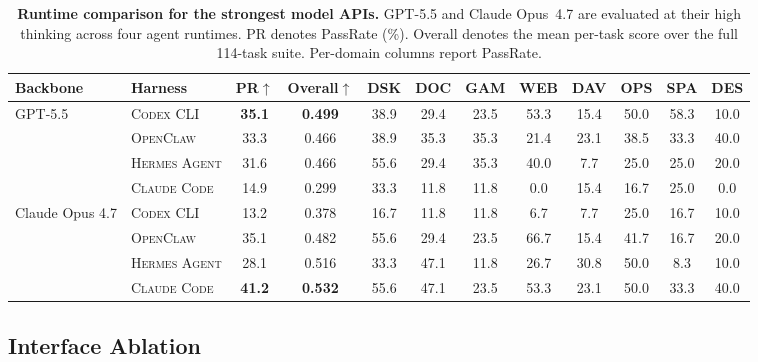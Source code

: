 \begin{table}[t]
\centering
\footnotesize
\setlength{\tabcolsep}{3pt}
\renewcommand{\arraystretch}{1.15}
\caption{\textbf{Runtime comparison for the strongest model APIs.}
GPT-5.5 and Claude Opus~4.7 are evaluated at their high thinking across four agent runtimes. PR denotes PassRate (\%). Overall denotes the mean per-task score over the full 114-task suite. Per-domain columns report PassRate.}
\label{tab:cross-harness}
\begin{tabular}{l l cc | cccccccc}
\toprule
\textbf{Backbone} & \textbf{Harness} & \textbf{PR}$\uparrow$ & \textbf{Overall}$\uparrow$ & \textbf{DSK} & \textbf{DOC} & \textbf{GAM} & \textbf{WEB} & \textbf{DAV} & \textbf{OPS} & \textbf{SPA} & \textbf{DES} \\
\midrule
\multirow{4}{*}{GPT-5.5}
& \textsc{Codex CLI}    & \textbf{35.1} & \textbf{0.499} & 38.9 & 29.4 & 23.5 & 53.3 & 15.4 & 50.0 & 58.3 & 10.0 \\
& \textsc{OpenClaw}     & 33.3          & 0.466          & 38.9 & 35.3 & 35.3 & 21.4 & 23.1 & 38.5 & 33.3 & 40.0 \\
& \textsc{Hermes Agent} & 31.6          & 0.466          & 55.6 & 29.4 & 35.3 & 40.0 &  7.7 & 25.0 & 25.0 & 20.0 \\
& \textsc{Claude Code}  & 14.9          & 0.299          & 33.3 & 11.8 & 11.8 &  0.0 & 15.4 & 16.7 & 25.0 &  0.0 \\
\midrule
\multirow{4}{*}{Claude Opus 4.7}
& \textsc{Codex CLI}    & 13.2          & 0.378          & 16.7 & 11.8 & 11.8 &  6.7 &  7.7 & 25.0 & 16.7 & 10.0 \\
& \textsc{OpenClaw}     & 35.1          & 0.482          &  55.6 & 29.4 & 23.5 & 66.7 & 15.4 & 41.7 & 16.7 & 20.0 \\
& \textsc{Hermes Agent} & 28.1          & 0.516          & 33.3 & 47.1 & 11.8 & 26.7 & 30.8 & 50.0 &  8.3 & 10.0 \\
& \textsc{Claude Code}  & \textbf{41.2} & \textbf{0.532} & 55.6 & 47.1 & 23.5 & 53.3 & 23.1 & 50.0 & 33.3 & 40.0 \\
\bottomrule
\end{tabular}
\end{table}

\subsection{Interface Ablation}
\label{sec:channel-ablation}


